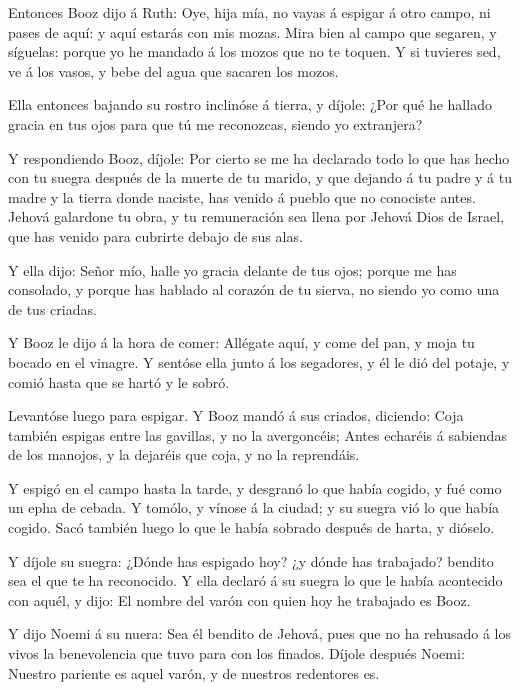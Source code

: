  Entonces Booz dijo á Ruth: Oye, hija mía, no vayas á
espigar á otro campo, ni pases de aquí: y aquí estarás con mis mozas.
 Mira bien al campo que segaren, y síguelas: porque yo he
mandado á los mozos que no te toquen. Y si tuvieres sed, ve á los vasos,
y bebe del agua que sacaren los mozos.

 Ella entonces bajando su rostro inclinóse á tierra, y
díjole: ¿Por qué he hallado gracia en tus ojos para que tú me
reconozcas, siendo yo extranjera?

 Y respondiendo Booz, díjole: Por cierto se me ha declarado
todo lo que has hecho con tu suegra después de la muerte de tu marido, y
que dejando á tu padre y á tu madre y la tierra donde naciste, has
venido á pueblo que no conociste antes.  Jehová galardone
tu obra, y tu remuneración sea llena por Jehová Dios de Israel, que has
venido para cubrirte debajo de sus alas.

 Y ella dijo: Señor mío, halle yo gracia delante de tus
ojos; porque me has consolado, y porque has hablado al corazón de tu
sierva, no siendo yo como una de tus criadas.

 Y Booz le dijo á la hora de comer: Allégate aquí, y come
del pan, y moja tu bocado en el vinagre. Y sentóse ella junto á los
segadores, y él le dió del potaje, y comió hasta que se hartó y le
sobró.

 Levantóse luego para espigar. Y Booz mandó á sus criados,
diciendo: Coja también espigas entre las gavillas, y no la avergoncéis;
 Antes echaréis á sabiendas de los manojos, y la dejaréis
que coja, y no la reprendáis.

 Y espigó en el campo hasta la tarde, y desgranó lo que
había cogido, y fué como un epha de cebada.  Y tomólo, y
vínose á la ciudad; y su suegra vió lo que había cogido. Sacó también
luego lo que le había sobrado después de harta, y dióselo.

 Y díjole su suegra: ¿Dónde has espigado hoy? ¿y dónde has
trabajado? bendito sea el que te ha reconocido. Y ella declaró á su
suegra lo que le había acontecido con aquél, y dijo: El nombre del varón
con quien hoy he trabajado es Booz.

 Y dijo Noemi á su nuera: Sea él bendito de Jehová, pues
que no ha rehusado á los vivos la benevolencia que tuvo para con los
finados. Díjole después Noemi: Nuestro pariente es aquel varón, y de
nuestros redentores es.

